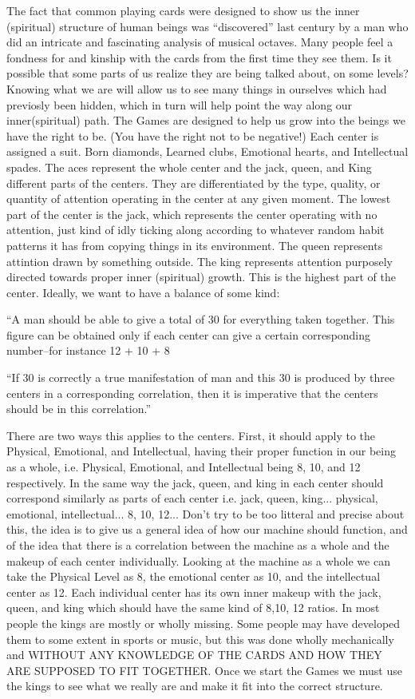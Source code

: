 \documentclass[12pt,letterpaper]{book}
\begin{document}
The fact that common playing cards were designed to show us the inner (spiritual) structure of human beings was ``discovered'' last century by a man who did an intricate and fascinating analysis of musical octaves. Many people feel a fondness for and kinship with the cards from the first time they see them. Is it possible that some parts of us realize they are being talked about, on some levels? Knowing what we are will allow us to see many things in ourselves which had previosly been hidden, which in turn will help point the way along our inner(spiritual) path. The Games are designed to help us grow into the beings we have the right to be. (You have the right not to be negative!) Each center is assigned a suit. Born diamonds, Learned clubs, Emotional hearts, and Intellectual spades. The aces represent the whole center and the jack, queen, and King different parts of the centers. They are differentiated by the type, quality, or quantity of attention operating in the center at any given moment. The lowest part of the center is the jack, which represents the center operating with no attention, just kind of idly ticking along according to whatever random habit patterns it has from copying things in its environment. The queen represents attintion drawn by something outside. The king represents attention purposely directed towards proper inner (spiritual) growth. This is the highest part of the center. Ideally, we want to have a balance of some kind:

``A man should be able to give a total of 30 for everything taken together. This figure can be obtained only if each center can give a certain corresponding number--for instance 12 + 10 + 8

``If 30 is correctly a true manifestation of man and this 30 is produced by three centers in a corresponding correlation, then it is imperative that the centers should be in this correlation.''

There are two ways this applies to the centers. First, it should apply to the Physical, Emotional, and Intellectual, having their proper function in our being as a whole, i.e. Physical, Emotional, and Intellectual being 8, 10, and 12 respectively. In the same way the jack, queen, and king in each center should correspond similarly as parts of each center i.e. jack, queen, king... physical, emotional, intellectual...  8, 10, 12... Don't try to be too litteral and precise about this, the idea is to give us a general idea of how our machine should function, and of the idea that there is a correlation between the machine as a whole and the makeup of each center individually. Looking at the machine as a whole we can take the Physical Level as 8, the emotional center as 10, and the intellectual center as 12. Each individual center has its own inner makeup with the jack, queen, and king which should have the same kind of 8,10, 12 ratios. In most people the kings are mostly or wholly missing. Some people may have developed them to some extent in sports or music, but this was done wholly mechanically and WITHOUT ANY KNOWLEDGE OF THE CARDS AND HOW THEY ARE SUPPOSED TO FIT TOGETHER. Once we start the Games we must use the kings to see what we really are and make it fit into the correct structure.
\end{document}
